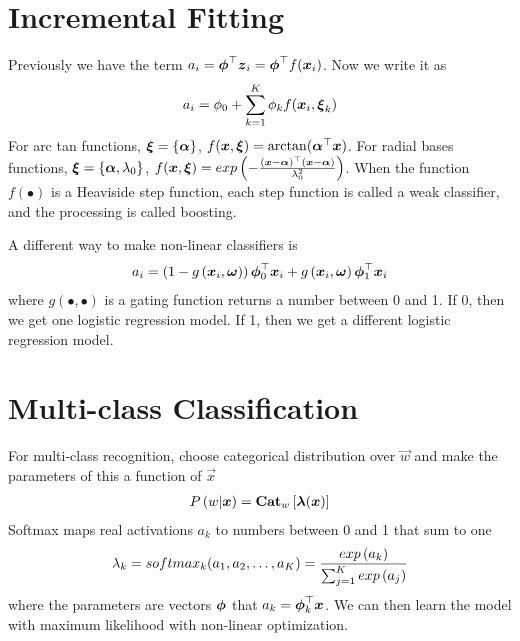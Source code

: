 \section{Incremental Fitting}
\label{section7.6}

Previously we have the term $a_i=\boldsymbol{\phi}^\top\boldsymbol{z}_i=\boldsymbol{\phi}^\top f(\boldsymbol{x}_i)$. Now we write it as
\begin{align*}
	a_i=\phi_0+\sum_{k=1}^K\phi_k f(\boldsymbol{x}_i,\boldsymbol{\xi}_k)
\end{align*}
For arc tan functions, $\boldsymbol{\xi}=\{\boldsymbol{\alpha}\}$, $f(\boldsymbol{x},\boldsymbol{\xi})=\arctan(\boldsymbol{\alpha}^\top\boldsymbol{x})$. For radial bases functions, $\boldsymbol{\xi}=\{\boldsymbol{\alpha},\lambda_0\}$, $f(\boldsymbol{x},\boldsymbol{\xi})=exp\left(-\frac{(\boldsymbol{x}-\boldsymbol{\alpha})^\top(\boldsymbol{x}-\boldsymbol{\alpha})}{\lambda_0^2}\right)$. When the function $f(\bullet)$ is a Heaviside step function, each step function is called a weak classifier, and the processing is called boosting.

A different way to make non-linear classifiers is
\begin{align*}
	a_i=\left(1-g\left(\boldsymbol{x}_i,\boldsymbol{\omega}\right)\right)\boldsymbol{\phi}_0^\top\boldsymbol{x}_i+g\left(\boldsymbol{x}_i,\boldsymbol{\omega}\right)\boldsymbol{\phi}_1^\top\boldsymbol{x}_i
\end{align*}
where $g(\bullet,\bullet)$ is a gating function returns a number between 0 and 1. If 0, then we get one logistic regression model. If 1, then we get a different logistic regression model.



\section{Multi-class Classification}
\label{section7.7}

For multi-class recognition, choose categorical distribution over $\vec{w}$ and make the parameters of this a function of $\vec{x}$
\begin{align*}
	P\left(w|\boldsymbol{x}\right)=\mathbf{Cat}_w\left[\boldsymbol{\lambda}(\boldsymbol{x})\right]
\end{align*}
Softmax maps real activations $a_k$ to numbers between 0 and 1 that sum to one
\begin{align*}
	\lambda_k=softmax_k(a_1,a_2,\dotsc,a_K)=\frac{exp\left(a_k\right)}{\sum_{j=1}^Kexp\left(a_j\right)}
\end{align*}
where the parameters are vectors $\boldsymbol{\phi}$ that $a_k=\boldsymbol{\phi}_k^\top\boldsymbol{x}$. We can then learn the model with maximum likelihood with non-linear optimization.
